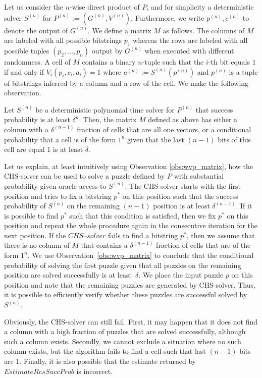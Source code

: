 Let us consider the $n$-wise direct product of $P$, and for simplicity a deterministic solver $S^{(n)}$ for $P^{(n)} := (G^{(n)}, V^{(n)})$.
Furthermore, we write $p^{(n)}, c^{(n)}$ to denote the output of $G^{(n)}$.
We define a matrix $M$ as follows. The columns of $M$ are labeled with all possible bitstrings $p_1$
whereas the rows are labeled with all possible tuples $(p_2, \dotsc, p_n)$ output by $G^{(n)}$ when executed with different randomness.
A cell of $M$ contains a binary $n$-tuple such that the $i$-th bit equals $1$ if and only if $V_i(p_i, c_i, a_i) = 1$ where
 $a^{(n)} := S^{(n)}(p^{(n)})$ and $p^{(n)}$ is a tuple of bitstrings inferred by a column and a row of the cell.
We make the following observation.
%
\begin{observation}
\label{obs:wvp_matrix}
Let $S^{(n)}$ be a deterministic polynomial time solver for $P^{(n)}$ that success probability is at least $\delta^{n}$.
Then, the matrix $M$ defined as above has either a column with a $\delta^{(n-1)}$ fraction of cells that are all one vectors, or
a conditional probability that a cell is of the form $1^n$ given that the last $(n-1)$ bits of this cell are equal $1$ is at least $\delta$.
\end{observation}
%
Let us explain, at least intuitively using Observation \ref{obs:wvp_matrix}, how the CHS-solver can be used to solve a puzzle defined by $P$
with substantial probability given oracle access to $S^{(n)}$.
The CHS-solver starts with the first position and tries to fix a bitstring $p^*$ on this position such that the success probability of $S^{(n)}$ on the remaining $(n-1)$
position is at least $\delta^{(n-1)}$. If it is possible to find $p^*$ such that this condition is satisfied, then we fix $p^*$
on this position and repeat the whole procedure again in the consecutive iteration for the next position.
If the $\mathit{CHS\text{--}solver}$ fails to find a bitstring $p^*$, then we assume that there is no column of $M$ that contains a $\delta^{(n-1)}$ fraction
of cells that are of the form $1^n$. We use Observation~\ref{obs:wvp_matrix} to conclude that the conditional probability of
solving the first puzzle given that all puzzles on the remaining position are solved successfully is at least~$\delta$.
We place the input puzzle $p$ on this position and note that the remaining puzzles are generated by CHS-solver.
Thus, it is possible to efficiently verify whether these puzzles are successful solved by $S^{(n)}$.

Obviously, the CHS-solver can still fail. First, it may happen that it does not find a column
with a high fraction of puzzles that are solved successfully, although such a column exists.
Secondly, we cannot exclude a situation where no such column exists, but the algorithm fails to find a cell such that last $(n\!-\!1)$ bits are 1.
Finally, it is also possible that the estimate returned by $\mathit{EstimateResSuccProb}$ is incorrect.

